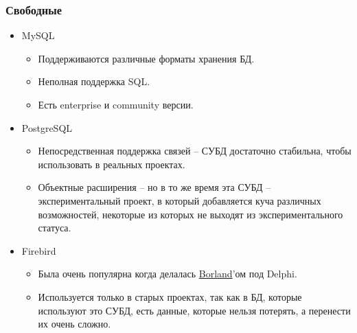 \subsubsection{Свободные}
\begin{itemize}
	\item MySQL
	      \begin{itemize}
		      \item Поддерживаются различные форматы хранения БД.
		      \item Неполная поддержка SQL.
		      \item Есть enterprise и community версии.
	      \end{itemize}
	\item PostgreSQL
	      \begin{itemize}
		      \item Непосредственная поддержка связей -- СУБД достаточно стабильна, чтобы использовать в реальных
		            проектах.
		      \item Объектные расширения -- но в то же время эта СУБД -- экспериментальный проект, в который
		            добавляется куча различных возможностей, некоторые из которых не выходят из экспериментального
		            статуса.
	      \end{itemize}
	\item Firebird
	      \begin{itemize}
		      \item Была очень популярна когда делалась \href{https://en.wikipedia.org/wiki/Borland}{Borland}'ом под Delphi.
		      \item Используется только в старых проектах, так как в БД, которые используют это СУБД, есть данные,
		            которые нельзя потерять, а перенести их очень сложно.
	      \end{itemize}
\end{itemize}

